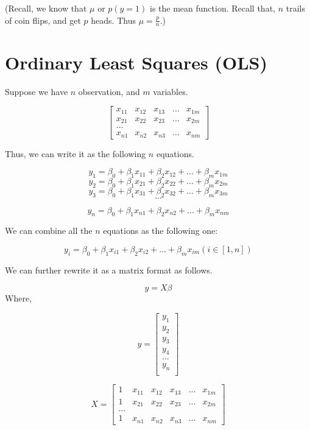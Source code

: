 \documentclass[
]{book}
\begin{document}
(Recall, we know that \(\mu\) or \(p(y=1)\) is the mean function. Recall that, \(n\) trails of coin flips, and get \(p\) heads. Thus \(\mu = \frac{p}{n}\).)

\hypertarget{ordinary-least-squares-ols}{%
\chapter{Ordinary Least Squares (OLS)}\label{ordinary-least-squares-ols}}

Suppose we have \(n\) observation, and \(m\) variables.

\[\begin{bmatrix}
x_{11} & x_{12} & x_{13} & ... & x_{1m}\\
x_{21} & x_{22} & x_{23} & ... & x_{2m} \\
...\\
x_{n1} & x_{n2} & x_{n3} & ... & x_{nm}
\end{bmatrix}\]

Thus, we can write it as the following \(n\) equations.

\[y_1=\beta_0+\beta_1 x_{11}+\beta_2 x_{12}+...+ \beta_m x_{1m}\]
\[y_2=\beta_0+\beta_1 x_{21}+\beta_2 x_{22}+...+ \beta_m x_{2m}\]
\[y_3=\beta_0+\beta_1 x_{31}+\beta_2 x_{32}+...+ \beta_m x_{3m}\]
\[...\]

\[y_n=\beta_0+\beta_1 x_{n1}+\beta_2 x_{n2}+...+ \beta_m x_{nm}\]

We can combine all the \(n\) equations as the following one:

\[y_i=\beta_0+\beta_1 x_{i1}+\beta_2 x_{i2}+...+ \beta_m x_{im}  (i \in [1,n])\]

We can further rewrite it as a matrix format as follows.

\[y= X \beta\]
Where,

\[y = \begin{bmatrix}y_1 \\
y_2 \\
y_3 \\
y_4 \\
...\\
y_n \\
\end{bmatrix}\]

\[X=\begin{bmatrix}
1 & x_{11} & x_{12} & x_{13} & ... & x_{1m}\\
1 & x_{21} & x_{22} & x_{23} & ... & x_{2m} \\
...\\
1 & x_{n1} & x_{n2} & x_{n3} & ... & x_{nm}
\end{bmatrix}\]
\end{document}
